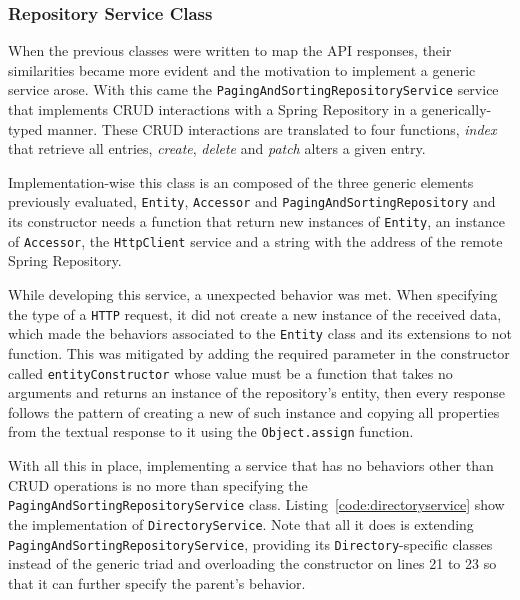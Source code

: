 \subsubsection{Repository Service Class}\label{hateoas:service}
When the previous classes were written to map the \gls{API} responses, their similarities became more evident and the motivation to implement a generic service arose. With this came the \texttt{PagingAndSortingRepositoryService} service that implements \gls{CRUD} interactions with a Spring Repository in a generically-typed manner. These \gls{CRUD} interactions are translated to four functions, \textit{index} that retrieve all entries, \textit{create}, \textit{delete} and \textit{patch} alters a given entry.

Implementation-wise this class is an composed of the three generic elements previously evaluated, \texttt{Entity}, \texttt{Accessor} and \texttt{PagingAndSortingRepository} and its constructor needs a function that return new instances of \texttt{Entity}, an instance of \texttt{Accessor}, the \texttt{HttpClient} service and a string with the address of the remote Spring Repository.

While developing this service, a unexpected behavior was met. When specifying the type of a \texttt{HTTP} request, it did not create a new instance of the received data, which made the behaviors associated to the \texttt{Entity} class and its extensions to not function. This was mitigated by adding the required parameter in the constructor called \texttt{entityConstructor} whose value must be a function that takes no arguments and returns an instance of the repository's entity, then every response follows the pattern of creating a new of such instance and copying all properties from the textual response to it using the \texttt{Object.assign} function.

With all this in place, implementing a service that has no behaviors other than \gls{CRUD} operations is no more than specifying the \texttt{PagingAndSortingRepositoryService} class. Listing~\ref{code:directoryservice} show the implementation of \texttt{DirectoryService}. Note that all it does is extending \texttt{PagingAndSortingRepositoryService}, providing its \texttt{Directory}-specific classes instead of the generic triad and overloading the constructor on lines 21 to 23 so that it can further specify the parent's behavior.



